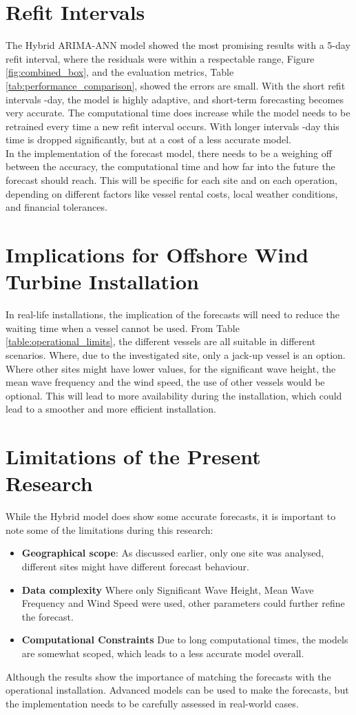 \section{Refit Intervals}
The Hybrid ARIMA-ANN model showed the most promising results with a 5-day refit interval, where the residuals were within a respectable range, Figure \ref{fig:combined_box}, and the evaluation metrics, Table \ref{tab:performance_comparison}, showed the errors are small. With the short refit intervals -day, the model is highly adaptive, and short-term forecasting becomes very accurate. The computational time does increase while the model needs to be retrained every time a new refit interval occurs. With longer intervals -day this time is dropped significantly, but at a cost of a less accurate model. \\

\noindent In the implementation of the forecast model, there needs to be a weighing off between the accuracy, the computational time and how far into the future the forecast should reach. This will be specific for each site and on each operation, depending on different factors like vessel rental costs, local weather conditions, and financial tolerances.  

\section{Implications for Offshore Wind Turbine Installation}
In real-life installations, the implication of the forecasts will need to reduce the waiting time when a vessel cannot be used. From Table \ref{table:operational_limits}, the different vessels are all suitable in different scenarios. Where, due to the investigated site, only a jack-up vessel is an option. Where other sites might have lower values, for the significant wave height, the mean wave frequency and the wind speed, the use of other vessels would be optional. This will lead to more availability during the installation, which could lead to a smoother and more efficient installation. 

\section{Limitations of the Present Research}
While the Hybrid model does show some accurate forecasts, it is important to note some of the limitations during this research:
\begin{itemize}
    \item \textbf{Geographical scope}: As discussed earlier, only one site was analysed, different sites might have different forecast behaviour. 
    \item \textbf{Data complexity} Where only Significant Wave Height, Mean Wave Frequency and Wind Speed were used, other parameters could further refine the forecast.
    \item \textbf{Computational Constraints} Due to long computational times, the models are somewhat scoped, which leads to a less accurate model overall.
\end{itemize}

Although the results show the importance of matching the forecasts with the operational installation. Advanced models can be used to make the forecasts, but the implementation needs to be carefully assessed in real-world cases.